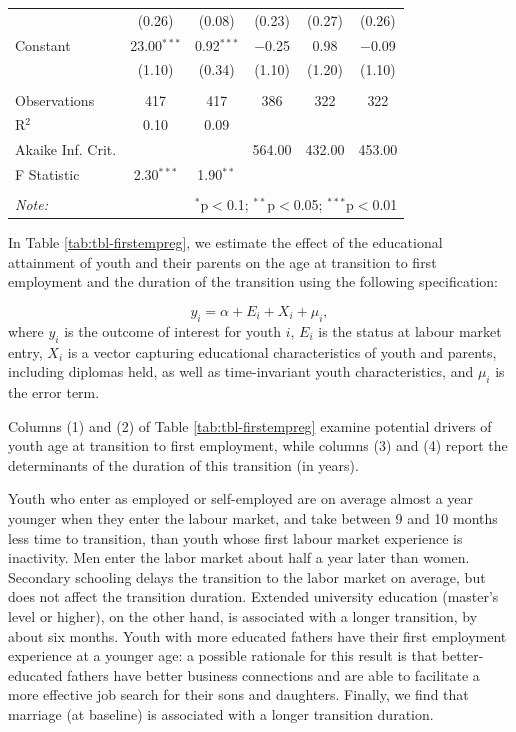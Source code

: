\documentclass[
  11pt,
a4paper
]{article}
\begin{document}
\begin{table}[H]
\begin{tabular}{@{\extracolsep{3pt}}lccccc}
  & (0.26) & (0.08) & (0.23) & (0.27) & (0.26) \\ 
  Constant & 23.00$^{***}$ & 0.92$^{***}$ & $-$0.25 & 0.98 & $-$0.09 \\ 
  & (1.10) & (0.34) & (1.10) & (1.20) & (1.10) \\ 
 \hline \\[-1.8ex] 
Observations & 417 & 417 & 386 & 322 & 322 \\ 
R$^{2}$ & 0.10 & 0.09 &  &  &  \\ 
Akaike Inf. Crit. &  &  & 564.00 & 432.00 & 453.00 \\ 
F Statistic & 2.30$^{***}$ & 1.90$^{**}$ &  &  &  \\ 
\hline 
\hline \\[-1.8ex] 
\textit{Note:}  & \multicolumn{5}{r}{$^{*}$p$<$0.1; $^{**}$p$<$0.05; $^{***}$p$<$0.01} \\ 
\end{tabular} 
\end{table} 
\doublespacing

\noindent In Table \ref{tab:tbl-firstempreg}, we estimate the effect of the educational attainment of youth and their parents on the age at transition to first employment and the duration of the transition using the following specification:

\[y_i = \alpha + E_i + X_i + \mu_i,\]
where \(y_i\) is the outcome of interest for youth \(i\), \(E_i\) is the status at labour market entry, \(X_i\) is a vector capturing educational characteristics of youth and parents, including diplomas held, as well as time-invariant youth characteristics, and \(\mu_i\) is the error term.

Columns (1) and (2) of Table \ref{tab:tbl-firstempreg} examine potential drivers of youth age at transition to first employment, while columns (3) and (4) report the determinants of the duration of this transition (in years).

Youth who enter as employed or self-employed are on average almost a year younger when they enter the labour market, and take between 9 and 10 months less time to transition, than youth whose first labour market experience is inactivity. Men enter the labor market about half a year later than women. Secondary schooling delays the transition to the labor market on average, but does not affect the transition duration. Extended university education (master's level or higher), on the other hand, is associated with a longer transition, by about six months. Youth with more educated fathers have their first employment experience at a younger age: a possible rationale for this result is that better-educated fathers have better business connections and are able to facilitate a more effective job search for their sons and daughters. Finally, we find that marriage (at baseline) is associated with a longer transition duration.
\end{document}
